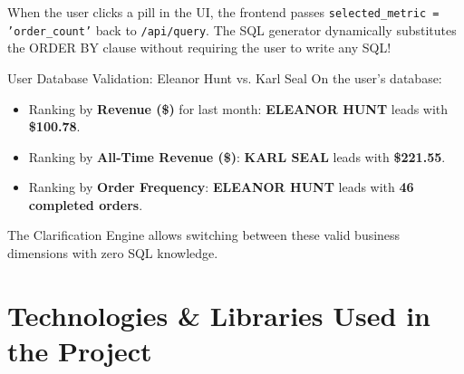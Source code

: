 \documentclass[10pt,a4paper]{article}
\begin{document}
When the user clicks a pill in the UI, the frontend passes \texttt{selected\_metric = 'order\_count'} back to \texttt{/api/query}. The SQL generator dynamically substitutes the ORDER BY clause without requiring the user to write any SQL!

\begin{successbox}{User Database Validation: Eleanor Hunt vs. Karl Seal}
On the user's database:
\begin{itemize}
    \item Ranking by \textbf{Revenue (\$)} for last month: \textbf{ELEANOR HUNT} leads with \textbf{\$100.78}.
    \item Ranking by \textbf{All-Time Revenue (\$)}: \textbf{KARL SEAL} leads with \textbf{\$221.55}.
    \item Ranking by \textbf{Order Frequency}: \textbf{ELEANOR HUNT} leads with \textbf{46 completed orders}.
\end{itemize}
The Clarification Engine allows switching between these valid business dimensions with zero SQL knowledge.
\end{successbox}

\newpage
\section{Technologies \& Libraries Used in the Project}
\end{document}
